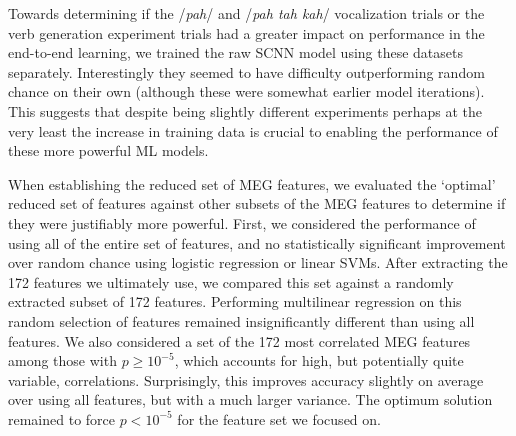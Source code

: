 \documentclass[fleqn,10pt]{wlscirep}
\begin{document}
Towards determining if the /{\em pah}/ and /{\em pah tah kah}/ vocalization trials or the verb generation experiment trials had a greater impact on performance in the end-to-end learning, we trained the raw SCNN model using these datasets separately. Interestingly they seemed to have difficulty outperforming random chance on their own (although these were somewhat earlier model iterations). This suggests that despite being slightly different experiments perhaps at the very least the increase in training data is crucial to enabling the performance of these more powerful ML models.

When establishing the reduced set of MEG features, we evaluated the `optimal' reduced set of features against other subsets of the MEG features to determine if they were justifiably more powerful. First, we considered the performance of using all of the entire set of features, and no statistically significant improvement over random chance using logistic regression or linear SVMs. After extracting the 172 features we ultimately use, we compared this set against a randomly extracted subset of 172 features. Performing multilinear regression on this random selection of features remained insignificantly different than using all features. We also considered a set of the 172 most correlated MEG features among those with $p \geq 10^{-5}$, which accounts for high, but potentially quite variable, correlations. Surprisingly, this improves accuracy slightly on average over using all features, but with a much larger variance. The optimum solution remained to force $p<10^{-5}$ for the feature set we focused on. %

\end{document}
